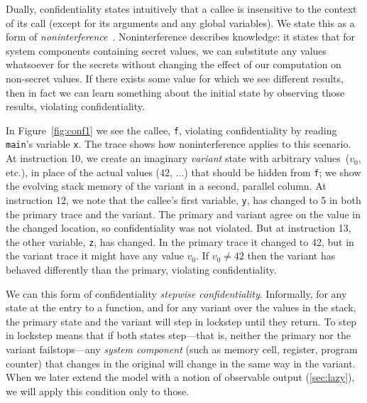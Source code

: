 \documentclass[acmsmall,review,anonymous]{acmart}\settopmatter{printfolios=true,printccs=false,printacmref=false}
\begin{document}
Dually, confidentiality states intuitively that a callee is insensitive to
the context of its call (except for its arguments and any global
variables).
We state this as a form of {\em noninterference}~\citep{Goguen1982SecurityPA}.
Noninterference describes knowledge: it states that for system components
containing secret values, we can substitute any values whatsoever for the secrets without changing the effect
of our computation on non-secret values.
If there exists some value for which we see different results, then
in fact we can learn something about the initial state by observing those results, violating
confidentiality.

In Figure~\ref{fig:conf1} we see the callee, {\tt f}, violating confidentiality
by reading {\tt main}'s variable {\tt x}. The trace
shows how noninterference applies to this scenario. At instruction 10, we
create an imaginary {\em variant}
state with arbitrary values~(\(v_0\), etc.),
in place of the actual values ($42$, ...) that should
be hidden from {\tt f}; we show the evolving stack memory of the variant in a second, parallel column. At instruction 12, we note that the callee's first variable, {\tt y}, has
changed to 5 in both the primary trace and the variant. The primary and variant agree on
the value in the changed location, so confidentiality was not violated. But at instruction 13,
the other variable, {\tt z}, has changed. In the primary trace it changed to 42, but
in the variant trace it might have any value \(v_0\). If \(v_0 \neq 42\) then the variant
has behaved differently than the primary, violating confidentiality.

We can this form of confidentiality {\em stepwise confidentiality}. Informally,
for any state at the entry to a function, and for any variant over the values in the stack,
the primary state and the variant will step in lockstep until they
return. To step in lockstep
means that if both states step---that is, neither the primary nor the variant failstops---any
{\em system component} (such as memory cell, register, program counter) that changes
in the original will change in the same way in the variant.
When we later extend the model with a notion of observable output
(\cref{sec:lazy}), we will apply this condition only to those.
\end{document}
